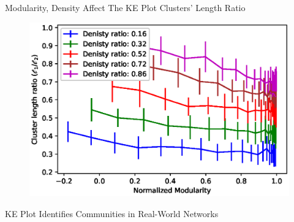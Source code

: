 \documentclass[aspectratio=169,11pt]{beamer}
\begin{document}
\begin{frame}{Modularity, Density Affect The KE Plot Clusters' Length Ratio}
	\begin{figure}
		\centering
		\includegraphics[scale=0.7]{length_ba.eps}
	\end{figure}
\end{frame}


\begin{frame}{KE Plot Identifies Communities in Real-World Networks}
	\begin{figure}
		\centering
	\end{figure}
\end{frame}
\end{document}
